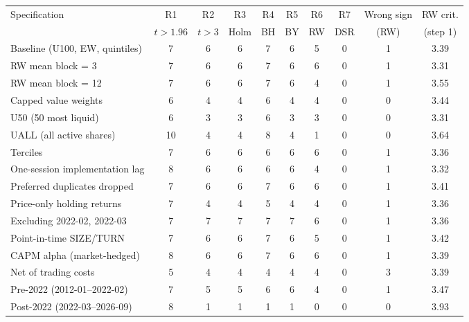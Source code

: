 \begin{tabular}{l ccccccc cc}
\toprule
Specification & R1 & R2 & R3 & R4 & R5 & R6 & R7 & Wrong sign & RW crit. \\
 & $t{>}1.96$ & $t{>}3$ & Holm & BH & BY & RW & DSR & (RW) & (step 1) \\
\midrule
Baseline (U100, EW, quintiles) & 7 & 6 & 6 & 7 & 6 & 5 & 0 & 1 & 3.39 \\
\quad RW mean block = 3 & 7 & 6 & 6 & 7 & 6 & 6 & 0 & 1 & 3.31 \\
\quad RW mean block = 12 & 7 & 6 & 6 & 7 & 6 & 4 & 0 & 1 & 3.55 \\
\addlinespace[2pt]
Capped value weights & 6 & 4 & 4 & 6 & 4 & 4 & 0 & 0 & 3.44 \\
U50 (50 most liquid) & 6 & 3 & 3 & 6 & 3 & 3 & 0 & 0 & 3.31 \\
UALL (all active shares) & 10 & 4 & 4 & 8 & 4 & 1 & 0 & 0 & 3.64 \\
Terciles & 7 & 6 & 6 & 6 & 6 & 6 & 0 & 1 & 3.36 \\
One-session implementation lag & 8 & 6 & 6 & 6 & 6 & 4 & 0 & 1 & 3.32 \\
Preferred duplicates dropped & 7 & 6 & 6 & 7 & 6 & 6 & 0 & 1 & 3.41 \\
Price-only holding returns & 7 & 4 & 4 & 5 & 4 & 4 & 0 & 1 & 3.36 \\
Excluding 2022-02, 2022-03 & 7 & 7 & 7 & 7 & 7 & 6 & 0 & 1 & 3.36 \\
Point-in-time SIZE/TURN & 7 & 6 & 6 & 7 & 6 & 5 & 0 & 1 & 3.42 \\
\addlinespace[2pt]
CAPM alpha (market-hedged) & 8 & 6 & 6 & 7 & 6 & 6 & 0 & 1 & 3.39 \\
Net of trading costs & 5 & 4 & 4 & 4 & 4 & 4 & 0 & 3 & 3.39 \\
\addlinespace[2pt]
Pre-2022 (2012-01--2022-02) & 7 & 5 & 5 & 6 & 6 & 4 & 0 & 1 & 3.47 \\
Post-2022 (2022-03--2026-09) & 8 & 1 & 1 & 1 & 1 & 0 & 0 & 0 & 3.93 \\
\bottomrule
\end{tabular}